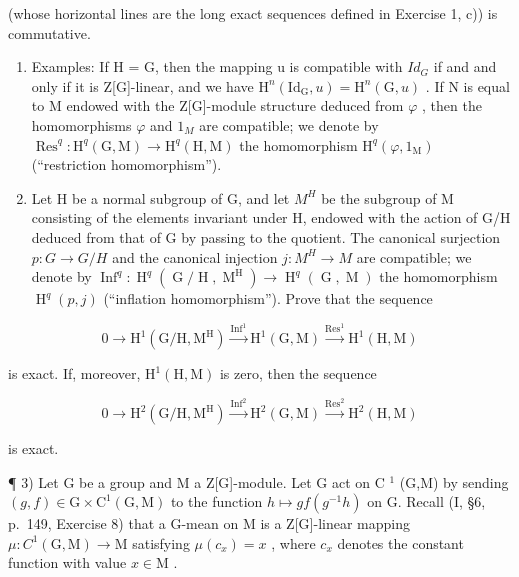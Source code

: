 (whose horizontal lines are the long exact sequences defined in Exercise 1, c)) is commutative.

\begin{enumerate}
\def\labelenumi{\alph{enumi})}
\setcounter{enumi}{3}
\item
  Examples: If H = G, then the mapping u is compatible with \(Id_{G}\) if and and only if it is Z{[}G{]}-linear, and we have \(\mathrm{H}^{n}(\mathrm{Id}_{\mathrm{G}}, u) = \mathrm{H}^{n}(\mathrm{G}, u)\) . If N is equal to M endowed with the Z{[}G{]}-module structure deduced from \(\varphi\) , then the homomorphisms \(\varphi\) and \(1_{M}\) are compatible; we denote by \(\operatorname{Res}^{q} : \mathrm{H}^{q}(\mathrm{G}, \mathrm{M}) \to \mathrm{H}^{q}(\mathrm{H}, \mathrm{M})\) the homomorphism \(\mathrm{H}^{q}(\varphi, 1_{\mathrm{M}})\) (``restriction homomorphism'').
\item
  Let H be a normal subgroup of G, and let \(M^{H}\) be the subgroup of M consisting of the elements invariant under H, endowed with the action of G/H deduced from that of G by passing to the quotient. The canonical surjection \(p: G \rightarrow G/H\) and the canonical injection \(j: M^{H} \rightarrow M\) are compatible; we denote by \(\operatorname{Inf}^{q}: \operatorname{H}^{q}(\operatorname{G}/\operatorname{H}, \operatorname{M}^{\operatorname{H}}) \to \operatorname{H}^{q}(\operatorname{G}, \operatorname{M})\) the homomorphism \(\operatorname{H}^{q}(p, j)\) (``inflation homomorphism''). Prove that the sequence
\end{enumerate}

\[
0 \to \mathrm{H} ^ {1} (\mathrm{G} / \mathrm{H}, \mathrm{M} ^ {\mathrm{H}}) \xrightarrow {\operatorname{Inf} ^ {1}} \mathrm{H} ^ {1} (\mathrm{G}, \mathrm{M}) \xrightarrow {\operatorname{Res} ^ {1}} \mathrm{H} ^ {1} (\mathrm{H}, \mathrm{M})
\]

is exact. If, moreover, \(\mathrm{H}^1 (\mathrm{H},\mathrm{M})\) is zero, then the sequence

\[
0 \to \mathrm{H} ^ {2} (\mathrm{G} / \mathrm{H}, \mathrm{M} ^ {\mathrm{H}}) \xrightarrow {\operatorname{Inf} ^ {2}} \mathrm{H} ^ {2} (\mathrm{G}, \mathrm{M}) \xrightarrow {\operatorname{Res} ^ {2}} \mathrm{H} ^ {2} (\mathrm{H}, \mathrm{M})
\]

is exact.

¶ 3) Let G be a group and M a Z{[}G{]}-module. Let G act on C \(^{1}\) (G,M) by sending \((g,f)\in\mathrm{G}\times\mathrm{C}^{1}(\mathrm{G},\mathrm{M})\) to the function \(h\mapsto gf(g^{-1}h)\) on G. Recall (I, §6, p.~149, Exercise 8) that a G-mean on M is a Z{[}G{]}-linear mapping \(\mu:C^{1}(\mathrm{G},\mathrm{M})\to\mathrm{M}\) satisfying \(\mu(c_{x})=x\) , where \(c_{x}\) denotes the constant function with value \(x\in\mathrm{M}\) .

